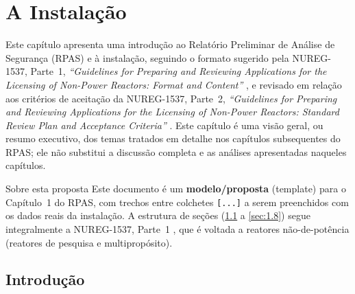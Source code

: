 \chapter{A Instala\c{c}\~ao}

Este cap\'itulo apresenta uma introdu\c{c}\~ao ao Relat\'orio Preliminar de
An\'alise de Seguran\c{c}a (RPAS) e \`a instala\c{c}\~ao, seguindo o formato
sugerido pela NUREG-1537, Parte~1, \emph{``Guidelines for Preparing and
Reviewing Applications for the Licensing of Non-Power Reactors: Format and
Content''} \citep{nureg1537p1}, e revisado em rela\c{c}\~ao aos crit\'erios de
aceita\c{c}\~ao da NUREG-1537, Parte~2, \emph{``Guidelines for Preparing and
Reviewing Applications for the Licensing of Non-Power Reactors: Standard
Review Plan and Acceptance Criteria''} \citep{nureg1537p2}. Este cap\'itulo \'e uma vis\~ao geral, ou resumo
executivo, dos temas tratados em detalhe nos cap\'itulos subsequentes do
RPAS; ele n\~ao substitui a discuss\~ao completa e as an\'alises
apresentadas naqueles cap\'itulos.

\begin{notaregulatoria}{Sobre esta proposta}
Este documento \'e um \textbf{modelo/proposta} (template) para o
Cap\'itulo~1 do RPAS, com trechos entre colchetes \texttt{[...]} a
serem preenchidos com os dados reais da instala\c{c}\~ao. A estrutura de
se\c{c}\~oes (\ref{sec:1.1} a \ref{sec:1.8}) segue integralmente a NUREG-1537, Parte~1
\citep{nureg1537p1}, que \'e voltada a reatores n\~ao-de-pot\^encia
(reatores de pesquisa e multiprop\'osito).
\end{notaregulatoria}

\section{Introdu\c{c}\~ao}
\label{sec:1.1}

